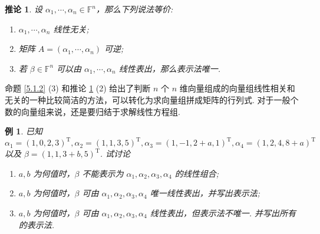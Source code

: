 \documentclass[10pt,openany]{article}
\theoremstyle{thmstyle} %
\theoremstyle{defstyle} %
\newtheorem{corollary}[theorem]{推论}
\theoremstyle{prostyle} %
\theoremstyle{exastyle}
\newtheorem{example}[theorem]{例}
\theoremstyle{remstyle}
\newcommand{\T}{^{\text{T}}}
\newcommand{\F}{\mathbb{F}}
\begin{document}
\begin{corollary} \label{5.1.3}
	设 \( \alpha_1,\cdots,\alpha_n \in \F^n \)，那么下列说法等价:
	\begin{enumerate}[(1)]
		\item \( \alpha_1,\cdots,\alpha_n \) 线性无关;
		\item 矩阵 \( A=(\alpha_1,\cdots,\alpha_n) \) 可逆;
		\item 若 \( \beta \in \F^n \) 可以由 \( \alpha_1,\cdots,\alpha_n \) 线性表出，那么表示法唯一.
	\end{enumerate}
\end{corollary}

命题 \ref{5.1.2} (3) 和推论 \ref{5.1.3} (2) 给出了判断 {\color{red} \( n \) 个 \( n \) 维向量}组成的向量组线性相关和无关的一种比较简洁的方法，可以转化为求向量组拼成矩阵的行列式. 对于一般个数的向量组来说，还是要归结于求解线性方程组.

\begin{example}
	已知 \( \alpha_1=(1,0,2,3)\T, \alpha_2=(1,1,3,5)\T, \alpha_3=(1,-1,2+a,1)\T, \alpha_4=(1,2,4,8+a)\T \) 以及 \( \beta=(1,1,3+b,5)\T \). 试讨论
	\begin{enumerate}[(1)]
		\item \(a,b \) 为何值时，\( \beta \) 不能表示为 \( \alpha_1,\alpha_2,\alpha_3,\alpha_4 \) 的线性组合;
		\item \(a,b \) 为何值时，\( \beta \) 可由 \( \alpha_1,\alpha_2,\alpha_3,\alpha_4 \) 唯一线性表出，并写出表示法;
		\item \(a,b \) 为何值时，\( \beta \) 可由 \( \alpha_1,\alpha_2,\alpha_3,\alpha_4 \) 线性表出，但表示法不唯一. 并写出所有的表示法.
	\end{enumerate}
\end{example}
\end{document}
